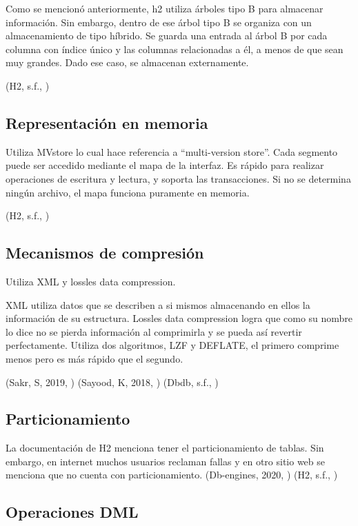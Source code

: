 \documentclass{acmart}
\begin{document}
Como se mencionó anteriormente, h2 utiliza árboles tipo B para almacenar información. Sin embargo, dentro de ese árbol tipo B se organiza con un almacenamiento de tipo híbrido. Se guarda una entrada al árbol B por cada columna con índice único y las columnas relacionadas a él, a menos de que sean muy grandes. Dado ese caso, se almacenan externamente.   

(H2, s.f., \cite{h2performance})

\subsection{Representación en memoria}

Utiliza MVstore lo cual hace referencia a “multi-version store”. Cada segmento puede ser accedido mediante el mapa de la interfaz. Es rápido para realizar operaciones de escritura y lectura, y soporta las transacciones. Si no se determina ningún archivo, el mapa funciona puramente en memoria. 

(H2, s.f., \cite{h2mvstore})

\subsection{Mecanismos de compresión}

Utiliza XML y lossles data compression. 

XML utiliza datos que se describen a si mismos almacenando en ellos la información de su estructura. Lossles data compression logra que como su nombre lo dice no se pierda información al comprimirla y se pueda así revertir perfectamente.  Utiliza dos algoritmos, LZF y DEFLATE, el primero comprime menos pero es más rápido que el segundo.  

(Sakr, S, 2019, \cite{h2xml})
(Sayood, K, 2018, \cite{h2losslesscompression})
(Dbdb, s.f., \cite{h2database})



\subsection{Particionamiento}

La documentación de H2 menciona tener el particionamiento de tablas. Sin embargo, en internet muchos usuarios reclaman fallas y en otro sitio web se menciona que no cuenta con particionamiento. 
(Db-engines, 2020, \cite{h2vsoracle})
(H2, s.f., \cite{h2roadmap})



\subsection{Operaciones DML}
\end{document}
